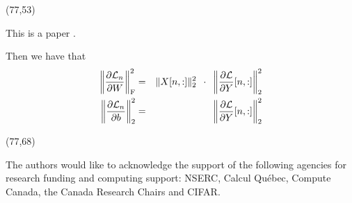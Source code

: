 \documentclass[a0,landscape]{a0poster}
\def\Head#1{\begin{center}\noindent{\LARGE\bf\color{MilaBlue}#1}\end{center}\bigskip}
\begin{document}
\begin{textblock}{0}(77,53)
\begin{minipage}{35cm}
\Head{Extra}

\vspace{-1em}

This is a paper \citet{zhao2014stochastic}.

Then we have that
\begin{eqnarray*}
\left\Vert \frac{\partial \mathcal{L}_n}{\partial W} \right\Vert_\textrm{F}^2 & = & \Vert X[n,:] \Vert_2^2  \hspace{0.5em} \cdot \hspace{0.5em} \left\Vert \frac{\partial \mathcal{L}}{\partial Y}[n,:] \right\Vert_2^2 \\
\left\Vert \frac{\partial \mathcal{L}_n}{\partial b} \right\Vert_2^2 & = & \left\Vert \frac{\partial \mathcal{L}}{\partial Y}[n,:] \right\Vert_2^2 \\
\end{eqnarray*}

\end{minipage}
\end{textblock}

\begin{textblock}{0}(77,68)


\begin{minipage}{35cm}
\vspace{0.5cm}
\small{%


}
\vspace{2em}

The authors would like to acknowledge the support of the following agencies for
research funding and computing support: NSERC, Calcul Qu\'{e}bec,
Compute Canada, the Canada Research Chairs and CIFAR.
\end{minipage}
\vspace{0.5cm}
\hspace{0.5cm}
\end{textblock}
\end{document}
